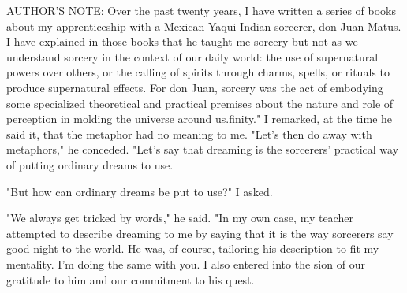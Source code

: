AUTHOR'S NOTE:
Over the past twenty years, I have written a series of books about my apprenticeship with a Mexican Yaqui Indian sorcerer, don Juan Matus. I have explained in those books that he taught me sorcery but not as we understand sorcery in the context of our daily world: the use of supernatural powers over others, or the calling of spirits through charms, spells, or rituals to produce supernatural effects. For don Juan, sorcery was the act of embodying some specialized theoretical and practical premises about the nature and role of perception in molding the universe around us.finity." I remarked, at the time he said it, that the metaphor had no meaning to me.
"Let's then do away with metaphors," he conceded. "Let's say that dreaming is the sorcerers' practical way of putting ordinary dreams to use.

"But how can ordinary dreams be put to use?" I asked.

"We always get tricked by words," he said. "In my own case, my teacher attempted to describe dreaming to me by saying that it is the way sorcerers say good night to the world. He was, of course, tailoring his description to fit my mentality. I'm doing the same with you.
I also entered into the sion of our gratitude to him and our commitment to his quest.